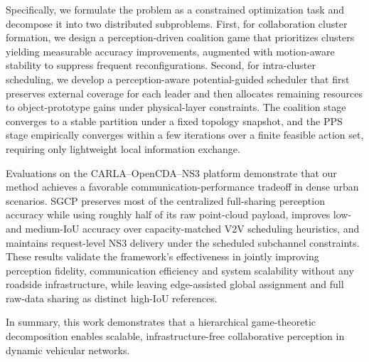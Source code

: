 \documentclass[conference]{IEEEtran}
\begin{document}
Specifically, we formulate the problem as a constrained optimization task and decompose it into two distributed subproblems. First, for collaboration cluster formation, we design a perception-driven coalition game that prioritizes clusters yielding measurable accuracy improvements, augmented with motion-aware stability to suppress frequent reconfigurations. Second, for intra-cluster scheduling, we develop a perception-aware potential-guided scheduler that first preserves external coverage for each leader and then allocates remaining resources to object-prototype gains under physical-layer constraints. The coalition stage converges to a stable partition under a fixed topology snapshot, and the PPS stage empirically converges within a few iterations over a finite feasible action set, requiring only lightweight local information exchange.

Evaluations on the CARLA–OpenCDA–NS3 platform demonstrate that our method achieves a favorable communication-performance tradeoff in dense urban scenarios. SGCP preserves most of the centralized full-sharing perception accuracy while using roughly half of its raw point-cloud payload, improves low- and medium-IoU accuracy over capacity-matched V2V scheduling heuristics, and maintains request-level NS3 delivery under the scheduled subchannel constraints. These results validate the framework’s effectiveness in jointly improving perception fidelity, communication efficiency and system scalability without any roadside infrastructure, while leaving edge-assisted global assignment and full raw-data sharing as distinct high-IoU references.

In summary, this work demonstrates that a hierarchical game-theoretic decomposition enables scalable, infrastructure-free collaborative perception in dynamic vehicular networks.



\end{document}
